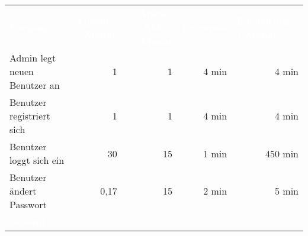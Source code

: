 \begin{tabular}{lrrrr}

\rowcolor{heading} 
\textcolor{white}{\textbf{Vorgang}} & 
\multicolumn{1}{l}{\textcolor{white}{\textbf{Anzahl / Monat}}} & 
\textcolor{white}{\textbf{Anzahl MA / Monat}} & 
\textcolor{white}{\textbf{Ersparnis}} &
\multicolumn{1}{l}{\textcolor{white}{\textbf{Einsparung / Monat}}} \\

Admin legt neuen Benutzer an & 1  & 1 & 4 min & 4 min \\
\rowcolor{odd}Benutzer registriert sich & 1  & 1 & 4 min & 4 min\\
Benutzer loggt sich ein & 30  & 15 & 1 min &  450 min\\
\rowcolor{odd} Benutzer ändert Passwort & 0,17  & 15 & 2 min & 5 min \\
\hline
\hline
\rowcolor{heading} \textcolor{white}{\textbf{Gesamt}} &  &  & &  \textcolor{white}{463 min} \\
\end{tabular}
